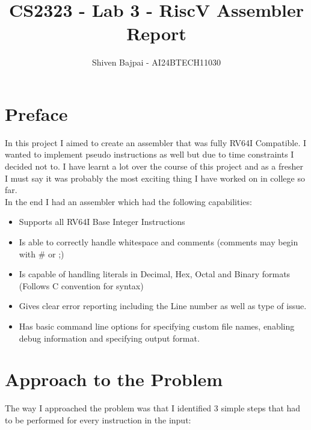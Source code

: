 \documentclass[12pt]{article}
\begin{document}
	
	\vspace{3cm}

	\title{CS2323 - Lab 3 - RiscV Assembler Report}
	\author{Shiven Bajpai - AI24BTECH11030}

	\maketitle
	\bigskip    	

	\renewcommand{\thefigure}{\theenumi}
	\renewcommand{\thetable}{\theenumi}

	\tableofcontents
	\newpage

    \section{Preface}
    In this project I aimed to create an assembler that was fully RV64I Compatible. I wanted to implement pseudo instructions as well but due to time constraints I decided not to. I have learnt a lot over the course of this project and as a fresher I must say it was probably the most exciting thing I have worked on in college so far.
    \\

    In the end I had an assembler which had the following capabilities:
    \begin{itemize}
        \item Supports all RV64I Base Integer Instructions
        \item Is able to correctly handle whitespace and comments (comments may begin with \# or ;)
        \item Is capable of handling literals in Decimal, Hex, Octal and Binary formats (Follows C convention for syntax)
        \item Gives clear error reporting including the Line number as well as type of issue.
        \item Has basic command line options for specifying custom file names, enabling debug information and specifying output format.
    \end{itemize}

    \section{Approach to the Problem}

    The way I approached the problem was that I identified 3 simple steps that had to be performed for every instruction in the input:
\end{document}
